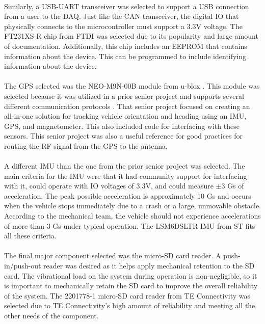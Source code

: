 \paragraph{}
Similarly, a USB-UART transceiver was selected to support a USB connection from a user to the DAQ.
Just like the CAN transceiver, the digital IO that physically connects to the microcontroller must support a 3.3V voltage.
The FT231XS-R chip from FTDI \cite{USBProductPage} was selected due to its popularity and large amount of documentation.
Additionally, this chip includes an EEPROM that contains information about the device.
This can be programmed to include identifying information about the device.

\paragraph{}
The GPS selected was the NEO-M9N-00B module from u-blox \cite{GPSProductPage}.
This module was selected because it was utilized in a prior senior project and supports several different communication protocols \cite{chen2024gpsimu}.
That senior project focused on creating an all-in-one solution for tracking vehicle orientation and heading using an IMU, GPS, and magnetometer.
This also included code for interfacing with these sensors.
This senior project was also a useful reference for good practices for routing the RF signal from the GPS to the antenna.

\paragraph{}
A different IMU than the one from the prior senior project was selected.
The main criteria for the IMU were that it had community support for interfacing with it, could operate with IO voltages of 3.3V, and could measure $\pm$3 Gs of acceleration.
The peak possible acceleration is approximately 10 Gs and occurs when the vehicle stops immediately due to a crash or a large, unmovable obstacle.
According to the mechanical team, the vehicle should not experience accelerations of more than 3 Gs under typical operation.
The LSM6DSLTR IMU from ST \cite{IMUProductPage} fits all these criteria.

\paragraph{}
The final major component selected was the micro-SD card reader.
A push-in/push-out reader was desired as it helps apply mechanical retention to the SD card.
The vibrational load on the system during operation is non-negligible, so it is important to mechanically retain the SD card to improve the overall reliability of the system.
The 2201778-1 micro-SD card reader from TE Connectivity \cite{SDReaderProductPage} was selected due to TE Connectivity's high amount of reliability and meeting all the other needs of the component.

